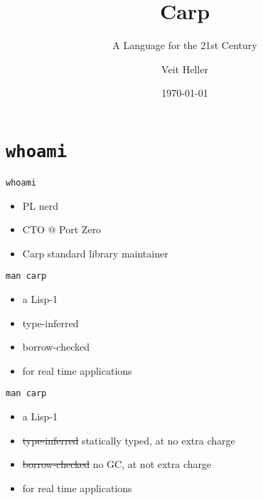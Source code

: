 \documentclass{beamer}
\title{Carp}
\subtitle{A Language for the 21st Century}
\date{\today}
\author{Veit Heller}
\institute{Port Zero}
\begin{document}
  \maketitle
  \section{\texttt{whoami}}
  \begin{frame}{\texttt{whoami}}
    \begin{itemize}
    \item PL nerd
    \item CTO @ Port Zero
    \item Carp standard library maintainer
    \end{itemize}
  \end{frame}
  \begin{frame}{\texttt{man carp}}
    \begin{itemize}
    \item a Lisp-1
    \item type-inferred
    \item borrow-checked
    \item for real time applications
    \end{itemize}
  \end{frame}
  \begin{frame}{\texttt{man carp}}
    \begin{itemize}
    \item a Lisp-1
    \item \sout{type-inferred} statically typed, at no extra charge
    \item \sout{borrow-checked} no GC, at not extra charge
    \item for real time applications
    \end{itemize}
  \end{frame}
\end{document}
